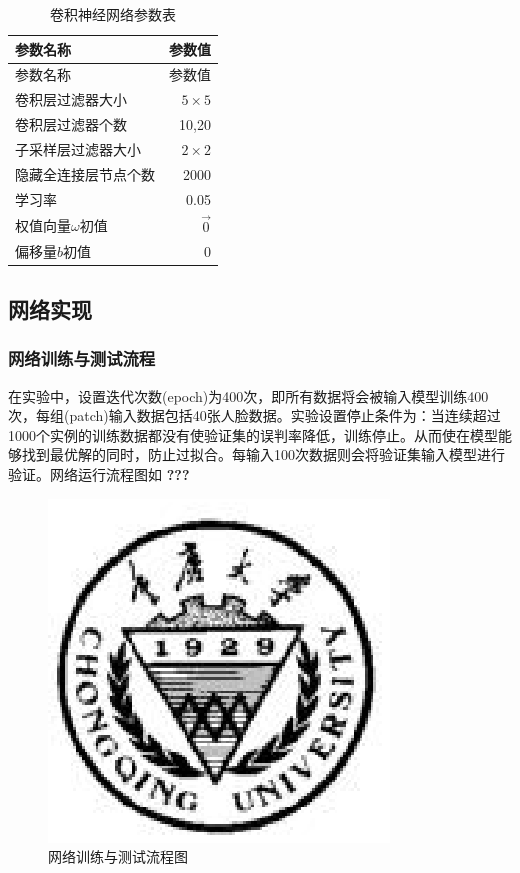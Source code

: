 \documentclass[bachelor,zhspacing]{cqu}  %
\begin{document}
\begin{longtable}[]{@{}lr@{}}
\caption{\label{tbl:cnn-params}卷积神经网络参数表 }\tabularnewline
\toprule
参数名称 & 参数值\tabularnewline
\midrule
\endfirsthead
\toprule
参数名称 & 参数值\tabularnewline
\midrule
\endhead
卷积层过滤器大小 & \(5\times 5\)\tabularnewline
卷积层过滤器个数 & 10,20\tabularnewline
子采样层过滤器大小 & \(2\times 2\)\tabularnewline
隐藏全连接层节点个数 & 2000\tabularnewline
学习率 & 0.05\tabularnewline
权值向量\(\omega\)初值 & \(\vec{0}\)\tabularnewline
偏移量\(b\)初值 & 0\tabularnewline
\bottomrule
\end{longtable}

\subsection{网络实现}\label{ux7f51ux7edcux5b9eux73b0}

\subsubsection{网络训练与测试流程}\label{ux7f51ux7edcux8badux7ec3ux4e0eux6d4bux8bd5ux6d41ux7a0b}

在实验中，设置迭代次数(epoch)为400次，即所有数据将会被输入模型训练400次，每组(patch)输入数据包括40张人脸数据。实验设置停止条件为：当连续超过1000个实例的训练数据都没有使验证集的误判率降低，训练停止。从而使在模型能够找到最优解的同时，防止过拟合。每输入100次数据则会将验证集输入模型进行验证。网络运行流程图如
\textbf{???}

\begin{figure}[htbp]
\centering
\includegraphics{./pic/cqu.eps}
\caption{网络训练与测试流程图}\label{fig:cnn-flow}
\end{figure}
\end{document}
